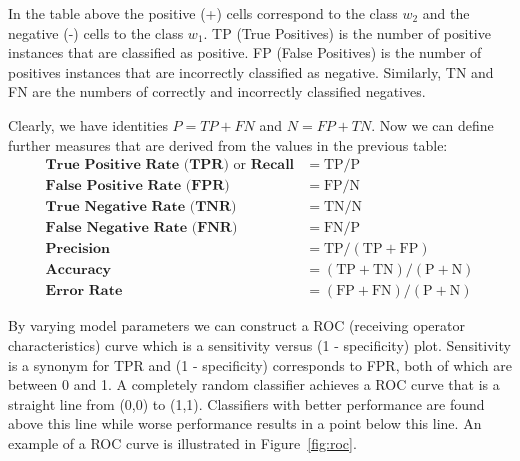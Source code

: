 In the table above the positive (+) cells correspond to the class $w_2$ and the negative (-) cells to the class $w_1$. TP (True Positives) is the number of positive instances that are classified as positive. FP (False Positives) is the number of positives instances that are incorrectly classified as negative. Similarly, TN and FN are the numbers of correctly and incorrectly classified negatives. \cite{RamirezPozo09}

Clearly, we have identities $P = TP + FN$ and $N = FP + TN$. Now we can define further measures that are derived from the values in the previous table:
\begin{align}
\textbf{True Positive Rate (TPR)} \text{ or } \textbf{Recall} &= \text{TP} / \text{P} \\
\textbf{False Positive Rate (FPR)} &= \text{FP} / \text{N} \\
\textbf{True Negative Rate (TNR)} &= \text{TN} / \text{N} \\
\textbf{False Negative Rate (FNR)} &= \text{FN} / \text{P} \\
\textbf{Precision} &= \text{TP} / (\text{TP} + \text{FP}) \\
\textbf{Accuracy} &= (\text{TP} + \text{TN}) / (\text{P} + \text{N}) \\
\textbf{Error Rate} &= (\text{FP} + \text{FN}) / (\text{P} + \text{N})
\end{align}

By varying model parameters we can construct a ROC (receiving operator characteristics) curve which is a sensitivity versus (1 - specificity) plot. Sensitivity is a synonym for TPR and (1 - specificity) corresponds to FPR, both of which are between 0 and 1. A completely random classifier achieves a ROC curve that is a straight line from (0,0) to (1,1). Classifiers with better performance are found above this line while worse performance results in a point below this line. \cite{RamirezPozo09} An example of a ROC curve is illustrated in Figure~\ref{fig:roc}.

